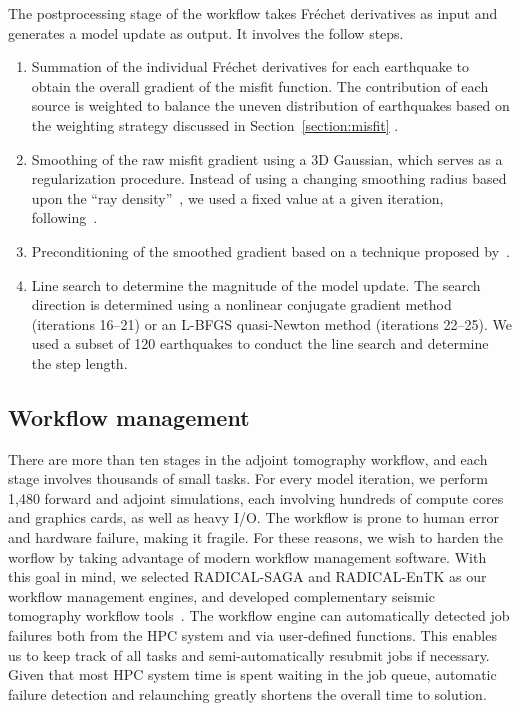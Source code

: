 \documentclass[extra,mreferee]{gji}
\begin{document}
The postprocessing stage of the workflow takes Fr\'echet derivatives as input and
generates a model update as output.
It involves the follow steps.
\begin{enumerate}
  \item Summation of the individual Fr\'echet derivatives for each earthquake to obtain the overall gradient of the misfit function. The contribution of each source is weighted to balance
    the uneven distribution of earthquakes based on the weighting strategy discussed in Section~\ref{section:misfit} .
  \item Smoothing of the raw misfit gradient using a 3D Gaussian, which
    serves as a regularization procedure. Instead of using a changing
    smoothing radius based upon the ``ray density''~\citep{bozdaug2016global},
    we used a fixed value at a given iteration, following~\cite{zhu2012structure}.
  \item Preconditioning of the smoothed gradient based on a technique proposed by~\cite{luo2013strategies}.
  \item Line search to determine the magnitude of the model update.
  The search direction is determined using a nonlinear conjugate gradient method~\citep{wright1999numerical} (iterations 16--21) or an L-BFGS quasi-Newton method (iterations 22--25).
  We used a subset of 120 earthquakes to conduct the line search and determine the step length.
\end{enumerate}

\subsection{Workflow management}

There are more than ten stages in the adjoint tomography workflow,
and each stage involves thousands of small tasks.
For every model iteration,
we perform 1,480 forward and adjoint simulations, each involving hundreds of compute cores and graphics cards, as well as heavy I/O.
The workflow is prone to human error and hardware failure, making it fragile.
For these reasons, we wish to harden the worflow by taking advantage of modern workflow management software.
With this goal in mind, we selected RADICAL-SAGA and RADICAL-EnTK as our workflow management engines, and developed complementary seismic tomography workflow tools~\citep{EnTK2017}.
The workflow engine can automatically detected job failures both from the HPC system and via user-defined functions.
This enables us to keep track of all tasks and semi-automatically resubmit jobs if necessary.
Given that most HPC system time is spent waiting in the job queue, automatic failure detection and relaunching greatly shortens the overall time to solution.
\end{document}
